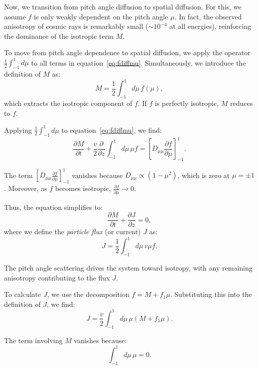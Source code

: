 Now, we transition from pitch angle diffusion to spatial diffusion. For this, we assume \( f \) is only weakly dependent on the pitch angle \( \mu \). In fact, the observed anisotropy of cosmic rays is remarkably small (\( \sim 10^{-4} \) at all energies), reinforcing the dominance of the isotropic term \( M \).

To move from pitch angle dependence to spatial diffusion, we apply the operator \( \frac{1}{2} \int_{-1}^1 d\mu \) to all terms in equation~\eqref{eq:fdiffmu}. Simultaneously, we introduce the definition of \( M \) as:
\begin{equation}
M = \frac{1}{2} \int_{-1}^1 d\mu \, f(\mu),
\end{equation}
which extracts the isotropic component of \( f \). If \( f \) is perfectly isotropic, \( M \) reduces to \( f \).

Applying \( \frac{1}{2} \int_{-1}^1 d\mu \) to equation~\eqref{eq:fdiffmu}, we find:
\begin{equation}
\frac{\partial M}{\partial t} + \frac{v}{2} \frac{\partial}{\partial z} \int_{-1}^1 d\mu \, \mu f = \left[ D_{\mu\mu} \frac{\partial f}{\partial \mu} \right]_{-1}^1.
\end{equation}

The term \( \left[ D_{\mu\mu} \frac{\partial f}{\partial \mu} \right]_{-1}^1 \) vanishes because \( D_{\mu\mu} \propto (1 - \mu^2) \), which is zero at \( \mu = \pm 1 \).
Moreover, as \( f \) becomes isotropic, \( \frac{\partial f}{\partial \mu} \to 0 \).

Thus, the equation simplifies to:
\begin{equation}
\frac{\partial M}{\partial t} + \frac{\partial J}{\partial z} = 0,
\end{equation}
where we define the \emph{particle flux} (or current) \( J \) as:
\begin{equation}
J = \frac{1}{2} \int_{-1}^1 d\mu \, v \mu f.
\end{equation}

The pitch angle scattering drives the system toward isotropy, with any remaining anisotropy contributing to the flux \( J \).

To calculate \( J \), we use the decomposition \( f = M + f_1 \mu \). Substituting this into the definition of \( J \), we find:
\begin{equation}
J = \frac{v}{2} \int_{-1}^1 d\mu \, \mu \left(M + f_1 \mu\right).
\end{equation}

The term involving \( M \) vanishes because:
\begin{equation}
\int_{-1}^1 d\mu \, \mu = 0.
\end{equation}


